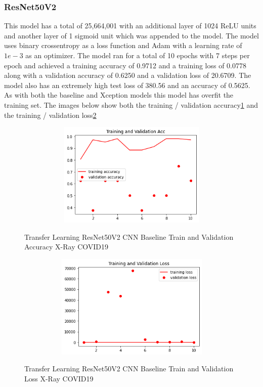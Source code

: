 \subsubsection{ResNet50V2}
This model has a total of 25,664,001 with an additional layer of 1024 ReLU units and another layer of 1 sigmoid unit which was appended to the model.  The model uses binary crossentropy as a loss function and Adam with a learning rate of $1e-3$ as an optimizer.  The model ran for a total of 10 epochs with 7 steps per epoch and achieved a training accuracy of 0.9712 and a training loss of 0.0778 along with a validation accuracy of 0.6250 and a validation loss of 20.6709.  The model also has an extremely high test loss of 380.56 and an accuracy of 0.5625.  As with both the baseline and Xception models this model has overfit the training set. The images below show both the training / validation accuracy\ref{fig:ResNet50V2 CNN Baseline Train and Validation Accuracy X-Ray COVID19} and the training / validation loss\ref{fig:ResNet50V2 CNN Baseline Train and Validation Loss X-Ray COVID19}
 \begin{figure}[H]
    \centering
    \includegraphics[width=1\textwidth,height=5cm,keepaspectratio]{Images/ResNet50V2BaselineTrainingValidationAccuracyXRayCOVID19.png}\\
    \caption{Transfer Learning ResNet50V2 CNN Baseline Train and Validation Accuracy X-Ray COVID19}
    \label{fig:ResNet50V2 CNN Baseline Train and Validation Accuracy X-Ray COVID19}
\end{figure}
 \begin{figure}[H]
    \centering
    \includegraphics[width=1\textwidth,height=5cm,keepaspectratio]{Images/ResNet50V2BaselineTrainingValidationLossXRayCOVID19.png}\\
    \caption{Transfer Learning ResNet50V2 CNN Baseline Train and Validation Loss X-Ray COVID19}
    \label{fig:ResNet50V2 CNN Baseline Train and Validation Loss X-Ray COVID19}
\end{figure}
